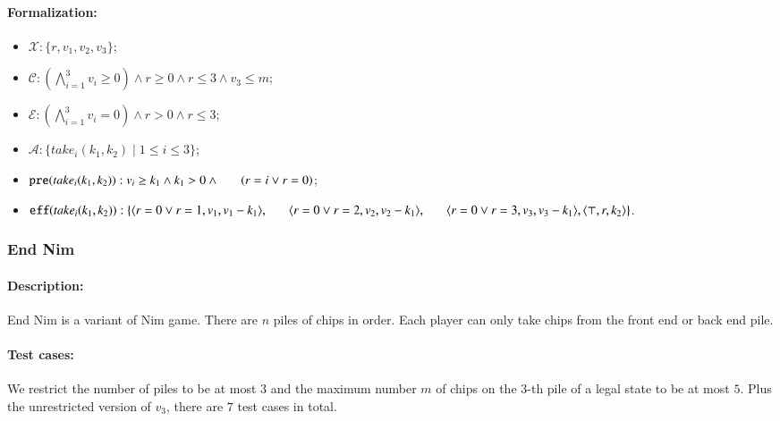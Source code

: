 \documentclass[review]{elsarticle}
\newcommand{\set}[1]{\{ #1 \}}
\newcommand{\tuple}[1]{\langle {#1} \rangle}
\newcommand{\true}{\top}
\newcommand{\statevar}{\mathcal{X}}
\newcommand{\act}{\mathcal{A}}
\newcommand{\constraint}{\mathcal{C}}
\newcommand{\estate}{\mathcal{E}}
\newcommand{\pre}{\mathtt{pre}}
\newcommand{\eff}{\mathtt{eff}}
\begin{document}
\paragraph{Formalization:}
\begin{itemize}
	\item $\statevar: \set{r, v_1, v_2, v_3}$;
	\item $\constraint: (\bigwedge_{i=1}^{3} v_i \ge 0) \wedge r \ge 0 \wedge r \le 3 \wedge v_3 \le m$;
	\item $\estate: (\bigwedge_{i=1}^{3} v_i = 0)\wedge r > 0 \wedge r \le 3 $;
	\item $\act:\set{take_i(k_1,k_2) {\mid}1 \le i\le 3}$;
	\item $\pre(take_i(k_1,k_2)) : v_i \ge k_1 \wedge k_1 > 0 \wedge \\ \hspace*{6mm}
	(r = i \vee r = 0)$;
	\item $\eff(take_i(k_1,k_2)) : \set{\tuple{r = 0\vee r = 1, v_1, v_1-k_1},\\ \hspace*{6mm}
		\tuple{r = 0\vee r = 2, v_2, v_2-k_1}, \\ \hspace*{6mm}
		\tuple{r =0\vee  r = 3, v_3, v_3-k_1},\tuple{\true, r, k_2}}$.
\end{itemize}

\subsubsection{End Nim \protect\cite{AlbN2001}}	
\paragraph{Description:} 
End Nim is a variant of Nim game.
There are $n $ piles of chips in order.
Each player can only take chips from the front end or back end pile.

\paragraph{Test cases:}
We restrict the number of piles to be at most $3$ and the maximum number $m$ of chips on the $3$-th pile of a legal state to be at most $5$.
Plus the unrestricted version of $v_3$, there are $7$ test cases in total.
\end{document}
